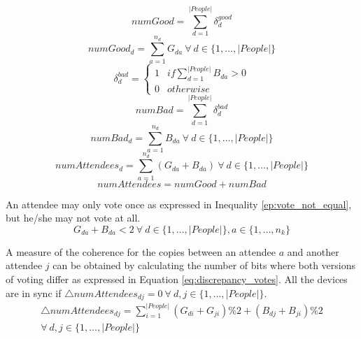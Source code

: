 \begin{equation} \label{eq:total_good_votes}
	numGood  = \sum^{|People|}_{d=1} \delta^{good}_{d}
\end{equation}
\begin{equation} \label{eq:local_total_good_votes}
	numGood_{d}  = \sum^{n_{d}}_{a=1} G_{da} ~ \forall ~ d \in \{1,\dots, |People|\}
\end{equation}
\begin{equation} \label{attendee_voted_bad}
	\delta^{bad}_{d} = \left\{\begin{array}{ll}
		1 & if \sum^{|People|}_{d=1} B_{da} > 0\\
		0 & otherwise
	\end{array}
	\right.
\end{equation}
\begin{equation} \label{eq:total_bad_votes}
	numBad  = \sum^{|People|}_{d=1} \delta^{bad}_{d}
\end{equation}
\begin{equation} \label{eq:local_total_bad_votes}
	numBad_{d}  = \sum^{n_{d}}_{a=1} B_{da} ~ \forall ~ d \in \{1,\dots, |People|\}
\end{equation}
\begin{equation} \label{eq:num_votes}
	numAttendees_{d}  = \sum^{n_{d}}_{a=1} (G_{da} + B_{da}) ~ \forall ~ d \in \{1,\dots, |People|\}
\end{equation}
\begin{equation} \label{eq:total_num_votes}
	numAttendees  = numGood + numBad
\end{equation}

An attendee may only vote once as expressed in Inequality \ref{ep:vote_not_equal}, but he/she may not vote at all.
\begin{equation} \label{ep:vote_not_equal}
	G_{da} + B_{da} < 2 ~ \forall ~ d \in \{1,\dots, |People|\}, a \in \{1,\dots, n_{k}\}
\end{equation}

A measure of the coherence for the copies between an attendee $a$ and another attendee $j$ can be obtained by calculating the number of bits where both versions of voting differ as expressed in Equation \ref{eq:discrepancy_votes}. All the devices are in sync if $\bigtriangleup numAttendees_{dj} = 0 ~ \forall ~ d, j \in \{1,\dots, |People|\}$.
\begin{multline} \label{eq:discrepancy_votes}
	\bigtriangleup numAttendees_{dj} = \sum^{|People|}_{i = 1} (G_{di} + G_{ji}) \% 2 + (B_{dj} + B_{ji}) \% 2\\ \forall ~ d, j \in \{1,\dots, |People|\}
\end{multline}

